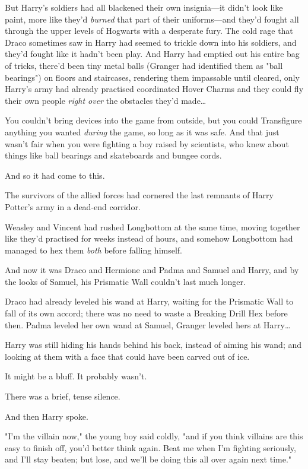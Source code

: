 But Harry's soldiers had all blackened their own insignia---it didn't look like
paint, more like they'd \emph{burned} that part of their uniforms---and they'd
fought all through the upper levels of Hogwarts with a desperate fury. The cold
rage that Draco sometimes saw in Harry had seemed to trickle down into his
soldiers, and they'd fought like it hadn't been play. And Harry had emptied out
his entire bag of tricks, there'd been tiny metal balls (Granger had identified
them as "ball bearings") on floors and staircases, rendering them impassable
until cleared, only Harry's army had already practised coordinated Hover Charms
and they could fly their own people \emph{right over} the obstacles they'd
made…

You couldn't bring devices into the game from outside, but you could
Transfigure anything you wanted \emph{during} the game, so long as it was safe.
And that just wasn't fair when you were fighting a boy raised by scientists,
who knew about things like ball bearings and skateboards and bungee cords.

And so it had come to this.

The survivors of the allied forces had cornered the last remnants of Harry
Potter's army in a dead-end corridor.

Weasley and Vincent had rushed Longbottom at the same time, moving together
like they'd practised for weeks instead of hours, and somehow Longbottom had
managed to hex them \emph{both} before falling himself.

And now it was Draco and Hermione and Padma and Samuel and Harry, and by the
looks of Samuel, his Prismatic Wall couldn't last much longer.

Draco had already leveled his wand at Harry, waiting for the Prismatic Wall to
fall of its own accord; there was no need to waste a Breaking Drill Hex before
then. Padma leveled her own wand at Samuel, Granger leveled hers at
Harry…

Harry was still hiding his hands behind his back, instead of aiming his wand;
and looking at them with a face that could have been carved out of ice.

It might be a bluff. It probably wasn't.

There was a brief, tense silence.

And then Harry spoke.

"I'm the villain now," the young boy said coldly, "and if you think villains
are this easy to finish off, you'd better think again. Beat me when I'm
fighting seriously, and I'll stay beaten; but lose, and we'll be doing this all
over again next time."

